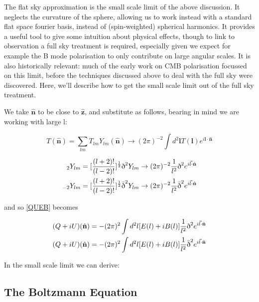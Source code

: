 \documentclass[a4paper,11pt]{article}
\renewcommand{\v}[1]{\mathbf{#1}}
\newcommand{\half}{\frac{1}{2}}
\newcommand{\unit}[1]{\hat{\v{#1}}}
\newcommand{\sr}{\text{\normalfont\dh}}
\renewcommand{\sl}{\bar{\text{\normalfont\dh}}}
\newcommand{\ltwo}{[\frac{(l+2)!}{(l-2)!}]}
\begin{document}
The flat sky approximation is the small scale limit of the above discussion. It neglects the curvature of the sphere, allowing us to work instead with a standard flat space fourier basis, instead of (spin-weighted) spherical harmonics. It provides a useful tool to give some intuition about physical effects, though to link to observation a full sky treatment is required, especially given we expect for example the B mode polarisation to only contribute on large angular scales. It is also historically relevant: much of the early work on CMB polarisation focussed on this limit, before the techniques discussed above to deal with the full sky were discovered. Here, we'll describe how to get the small scale limit out of the full sky treatment.

We take $\unit{n}$ to be close to $\unit{z}$, and substitute as follows, bearing in mind we are working with large l:

\begin{equation}
T(\unit{n}) = \sum_{lm} T_{lm}Y_{lm}(\unit{n}) \rightarrow (2\pi)^{-2} \int d^2\v{l} T(\v{l})e^{i\v{l}\cdot\unit{n}}
\end{equation}

\begin{align}
{}_2Y_{lm} &= \ltwo^\half\sr^2Y_{lm} \rightarrow (2\pi)^{-2} \frac{1}{l^2}\sr^2e^{i\vec{l}\cdot\unit{n}}\\
{}_{-2}Y_{lm} &= \ltwo^\half\sl^2Y_{lm} \rightarrow (2\pi)^{-2} \frac{1}{l^2}\sl^2e^{i\vec{l}\cdot\unit{n}}
\end{align}

and so \ref{QUEB} becomes

\begin{align}
(Q+iU)(\unit{n}) &= -(2\pi)^2\int d^2l [E(l)+iB(l)]  \frac{1}{l^2}\sr^2e^{i\vec{l}\cdot\unit{n}}\\
(Q+iU)(\unit{n}) &= -(2\pi)^2\int d^2l [E(l)+iB(l)] \frac{1}{l^2}\sl^2e^{i\vec{l}\cdot\unit{n}}
\end{align}

In the small scale limit we can derive:

\subsection{The Boltzmann Equation}
\end{document}
